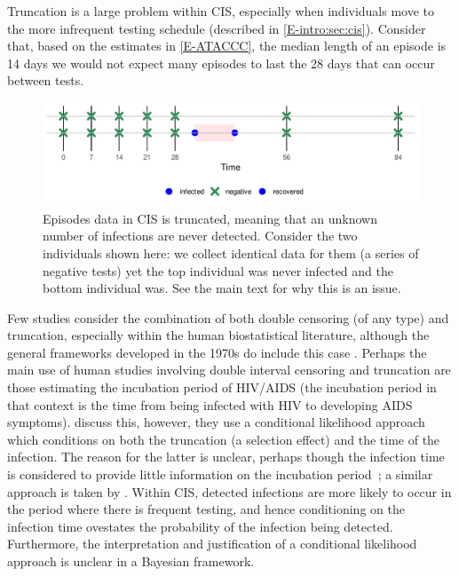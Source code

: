 \documentclass[thesis.tex]{subfiles}
\begin{document}
Truncation is a large problem within CIS, especially when individuals move to the more infrequent testing schedule (described in \cref{E-intro:sec:cis}).
Consider that, based on the estimates in \cref{E-ATACCC}, the median length of an episode is 14 days  we would not expect many episodes to last the 28 days that can occur between tests.
\begin{figure}
  \centering \includegraphics{cis-perfect-testing/truncation}
  \caption[Truncation in CIS data]{Episodes data in CIS is truncated, meaning that an unknown number of infections are never detected. Consider the two individuals shown here: we collect identical data for them (a series of negative tests) yet the top individual was never infected and the bottom individual was. See the main text for why this is an issue. \label{perf-test:fig:truncation}}
\end{figure}

Few studies consider the combination of both double censoring (of any type) and truncation, especially within the human biostatistical literature, although the general frameworks developed in the 1970s do include this case \autocites{turnbullEmpirical}{dempsterMaximum}.
Perhaps the main use of human studies involving double interval censoring and truncation are those estimating the incubation period of HIV/AIDS (the incubation period in that context is the time from being infected with HIV to developing AIDS symptoms).
\Textcite{sunEmpirical,bacchettiNonparametric} discuss this, however, they use a conditional likelihood approach which conditions on both the truncation (a selection effect) and the time of the infection.
The reason for the latter is unclear, perhaps though the infection time is considered to provide little information on the incubation period~; a similar approach is taken by \textcite{shenNonparametric}.
Within CIS, detected infections are more likely to occur in the period where there is frequent testing, and hence conditioning on the infection time ovestates the probability of the infection being detected.
Furthermore, the interpretation and justification of a conditional likelihood approach is unclear in a Bayesian framework.
\end{document}
